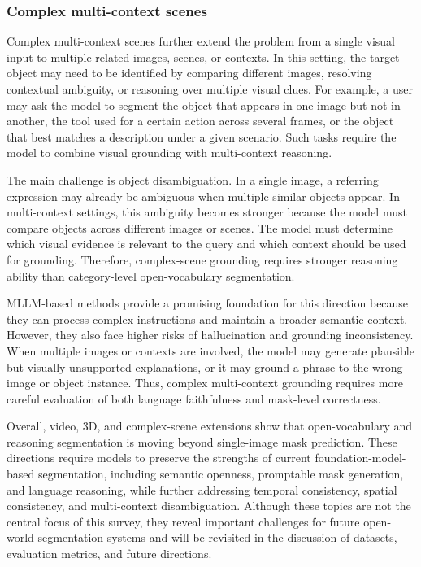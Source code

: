 \subsubsection{Complex multi-context scenes}

Complex multi-context scenes further extend the problem from a single visual input to multiple related images, scenes, or contexts. 
In this setting, the target object may need to be identified by comparing different images, resolving contextual ambiguity, or reasoning over multiple visual clues. 
For example, a user may ask the model to segment the object that appears in one image but not in another, the tool used for a certain action across several frames, or the object that best matches a description under a given scenario. 
Such tasks require the model to combine visual grounding with multi-context reasoning.

The main challenge is object disambiguation. 
In a single image, a referring expression may already be ambiguous when multiple similar objects appear. 
In multi-context settings, this ambiguity becomes stronger because the model must compare objects across different images or scenes. 
The model must determine which visual evidence is relevant to the query and which context should be used for grounding. 
Therefore, complex-scene grounding requires stronger reasoning ability than category-level open-vocabulary segmentation.

MLLM-based methods provide a promising foundation for this direction because they can process complex instructions and maintain a broader semantic context. 
However, they also face higher risks of hallucination and grounding inconsistency. 
When multiple images or contexts are involved, the model may generate plausible but visually unsupported explanations, or it may ground a phrase to the wrong image or object instance. 
Thus, complex multi-context grounding requires more careful evaluation of both language faithfulness and mask-level correctness.

Overall, video, 3D, and complex-scene extensions show that open-vocabulary and reasoning segmentation is moving beyond single-image mask prediction. 
These directions require models to preserve the strengths of current foundation-model-based segmentation, including semantic openness, promptable mask generation, and language reasoning, while further addressing temporal consistency, spatial consistency, and multi-context disambiguation. 
Although these topics are not the central focus of this survey, they reveal important challenges for future open-world segmentation systems and will be revisited in the discussion of datasets, evaluation metrics, and future directions.